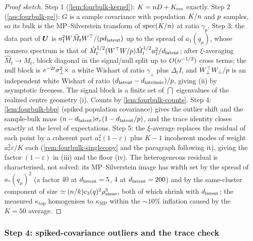 \begin{proof}[Proof sketch]
Step 1 (\cref{lem:fourbulk-kernel}): $K=n D+K_{\mathrm{res}}$ exactly. Step 2 (\cref{ass:fourbulk-ge}): $G$ is a sample covariance with population $K/n$ and $p$ samples, so its bulk is the MP--Silverstein transform of $\operatorname{spec}(K/n)$ at ratio $\gamma_p$. Step 3: the data part of $\bm{U}$ is $a_1^2W\hat M_tW^\top/(pd_{\mathrm{latent}})$ up to the spread of $a_1(q_\mu)$, whose nonzero spectrum is that of $\hat M_t^{1/2}(W^\top W/p)\hat M_t^{1/2}a_1^2/d_{\mathrm{latent}}$; after $\xi$-averaging $\hat M_t\to M_t$, block diagonal in the signal/null split up to $O(n^{-1/2})$ cross terms; the null block is $e^{-2t}\sigma_{\perp}^2\times$ a white Wishart of ratio $\gamma_\perp$ plus $\Delta_t I$, and $W_\perp^\top W_\perp/p$ is an independent white Wishart of ratio $(d_{\mathrm{latent}}-d_{\mathrm{intrinsic}})/p$, giving (ii) by asymptotic freeness. The signal block is a finite set of $\dint$ eigenvalues of the realized centre geometry (i). Counts by \cref{lem:fourbulk-counts}. Step 4: \cref{lem:fourbulk-bbp} (spiked population covariance) gives the outlier shift and the sample-bulk mass $(n-d_{\mathrm{latent}})\sigma_r(1-d_{\mathrm{latent}}/p)$, and the trace identity closes exactly at the level of expectations. Step 5: the $\xi$-average replaces the residual of each point by a coherent part $a_*^2(1-\varepsilon)$ plus $K-1$ incoherent modes of weight $a_*^2\varepsilon/K$ each (\cref{rem:fourbulk-singlecopy} and the paragraph following it), giving the factor $(1-\varepsilon)$ in (iii) and the floor (iv). The heterogeneous residual is characterised, not solved: its MP--Silverstein image has width set by the spread of $a_*(q_\mu)^2$ (a factor $40$ at $d_{\mathrm{latent}}=5$, $4$ at $d_{\mathrm{latent}}=200$) and by the same-cluster component of size $\simeq(n/k)c_3(q)^2\rho_{\mathrm{same}}^3$, both of which shrink with $d_{\mathrm{latent}}$; the measured $\kappa_{\mathrm{top}}$ homogenises to $\kappa_{\mathrm{MP}}$ within the $\sim10\%$ inflation caused by the $K=50$ average.
\end{proof}

\subsubsection{Step 4: spiked-covariance outliers and the trace check}

